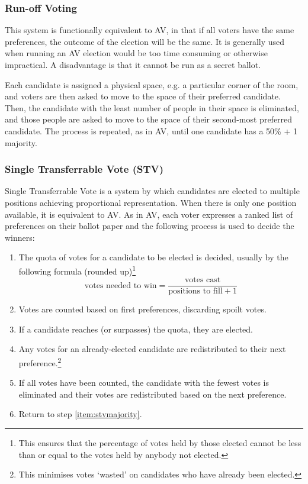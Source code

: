 \documentclass[a4paper, 12pt]{article} %
\begin{document}
\subsubsection{Run-off Voting}
This system is functionally equivalent to AV, in that if all voters have the same preferences, the outcome of the election will be the same.  It is generally used when running an AV election would be too time consuming or otherwise impractical.  A disadvantage is that it cannot be run as a secret ballot.

Each candidate is assigned a physical space, e.g. a particular corner of the room, and voters are then asked to move to the space of their preferred candidate.  Then, the candidate with the least number of people in their space is eliminated, and those people are asked to move to the space of their second-most preferred candidate.  The process is repeated, as in AV, until one candidate has a 50\% + 1 majority.

\subsubsection{Single Transferrable Vote (STV)}
Single Transferrable Vote is a system by which candidates are elected to multiple positions achieving proportional representation.  When there is only one position available, it is equivalent to AV.  As in AV, each voter expresses a ranked list of preferences on their ballot paper and the following process is used to decide the winners:

\begin{enumerate}
\item The quota of votes for a candidate to be elected is decided, usually by the following formula (rounded up)\footnote{This ensures that the percentage of votes held by those elected cannot be less than or equal to the votes held by anybody not elected.} \[\mbox{votes needed to win} = \frac{\mbox{votes cast}}{\mbox{positions to fill}+ 1} \]
\item Votes are counted based on first preferences, discarding spoilt votes.
\item \label{item:stvmajority} If a candidate reaches (or surpasses) the quota, they are elected.
\item Any votes for an already-elected candidate are redistributed to their next preference.\footnote{This minimises votes `wasted' on candidates who have already been elected.}
\item If all votes have been counted, the candidate with the fewest votes is eliminated and their votes are redistributed based on the next preference.
\item Return to step \ref{item:stvmajority}.
\end{enumerate}
\end{document}
